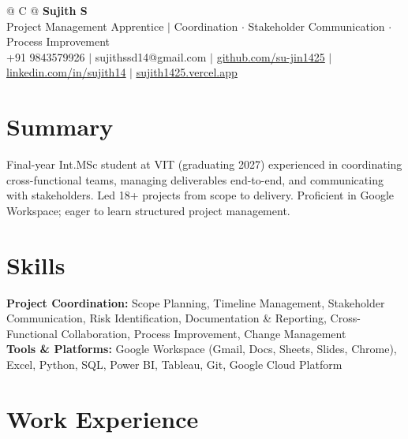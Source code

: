 \documentclass[a4paper,10pt]{article}
\newcommand{\ulink}[2]{\href{#1}{\uline{#2}}}
\begin{document}
\pagestyle{empty}

\begin{tabularx}{\linewidth}{@{} C @{}}
{\color[HTML]{000000}\fontsize{30}{35}\selectfont\bfseries Sujith S} \\[5pt]
{\fontsize{10.5}{12.5}\selectfont\color[HTML]{3A3A3A}
Project Management Apprentice $|$ Coordination $\cdot$ Stakeholder Communication $\cdot$ Process Improvement} \\[6pt]
{\fontsize{9.5}{11.5}\selectfont\textcolor[HTML]{3A3A3A}{+91 9843579926 $|$ sujithssd14@gmail.com $|$ \ulink{https://github.com/su-jin1425}{github.com/su-jin1425} $|$ \ulink{https://linkedin.com/in/sujith14}{linkedin.com/in/sujith14} $|$ \ulink{https://sujith1425.vercel.app}{sujith1425.vercel.app}}}
\end{tabularx}

\vspace{2pt}

\section{Summary}
\vspace{3pt}
{\color[HTML]{0A0A0A}\fontsize{11}{14}\selectfont
Final-year Int.MSc student at VIT (graduating 2027) experienced in coordinating cross-functional teams, managing deliverables end-to-end, and communicating with stakeholders. Led 18+ projects from scope to delivery. Proficient in Google Workspace; eager to learn structured project management.}

\vspace{2pt}

\section{Skills}
\vspace{3pt}
{\color[HTML]{0A0A0A}\fontsize{11}{14}\selectfont
\textbf{Project Coordination:} Scope Planning, Timeline Management, Stakeholder Communication, Risk Identification, Documentation \& Reporting, Cross-Functional Collaboration, Process Improvement, Change Management \\[2pt]
\textbf{Tools \& Platforms:} Google Workspace (Gmail, Docs, Sheets, Slides, Chrome), Excel, Python, SQL, Power BI, Tableau, Git, Google Cloud Platform}

\vspace{2pt}

\section{Work Experience}
\vspace{2pt}
\end{document}
